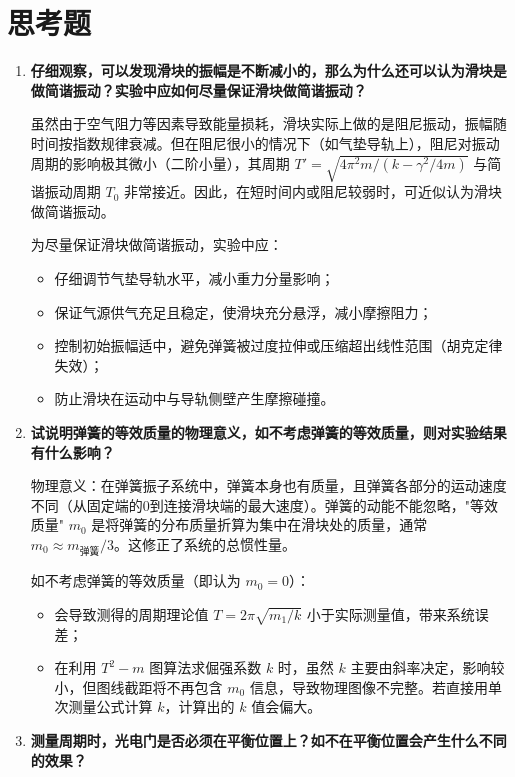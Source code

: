 \documentclass[11pt]{article}
\begin{document}
\section{思考题}

\begin{enumerate}
    \item \textbf{仔细观察，可以发现滑块的振幅是不断减小的，那么为什么还可以认为滑块是做简谐振动？实验中应如何尽量保证滑块做简谐振动？}
    
    虽然由于空气阻力等因素导致能量损耗，滑块实际上做的是阻尼振动，振幅随时间按指数规律衰减。但在阻尼很小的情况下（如气垫导轨上），阻尼对振动周期的影响极其微小（二阶小量），其周期 $T' = \sqrt{4\pi^2 m / (k - \gamma^2/4m)}$ 与简谐振动周期 $T_0$ 非常接近。因此，在短时间内或阻尼较弱时，可近似认为滑块做简谐振动。
    
    为尽量保证滑块做简谐振动，实验中应：
    \begin{itemize}
        \item 仔细调节气垫导轨水平，减小重力分量影响；
        \item 保证气源供气充足且稳定，使滑块充分悬浮，减小摩擦阻力；
        \item 控制初始振幅适中，避免弹簧被过度拉伸或压缩超出线性范围（胡克定律失效）；
        \item 防止滑块在运动中与导轨侧壁产生摩擦碰撞。
    \end{itemize}

    \item \textbf{试说明弹簧的等效质量的物理意义，如不考虑弹簧的等效质量，则对实验结果有什么影响？}
    
    物理意义：在弹簧振子系统中，弹簧本身也有质量，且弹簧各部分的运动速度不同（从固定端的0到连接滑块端的最大速度）。弹簧的动能不能忽略，"等效质量" $m_0$ 是将弹簧的分布质量折算为集中在滑块处的质量，通常 $m_0 \approx m_{\text{弹簧}}/3$。这修正了系统的总惯性量。
    
    如不考虑弹簧的等效质量（即认为 $m_0=0$）：
    \begin{itemize}
        \item 会导致测得的周期理论值 $T = 2\pi\sqrt{m_1/k}$ 小于实际测量值，带来系统误差；
        \item 在利用 $T^2-m$ 图算法求倔强系数 $k$ 时，虽然 $k$ 主要由斜率决定，影响较小，但图线截距将不再包含 $m_0$ 信息，导致物理图像不完整。若直接用单次测量公式计算 $k$，计算出的 $k$ 值会偏大。
    \end{itemize}

    \item \textbf{测量周期时，光电门是否必须在平衡位置上？如不在平衡位置会产生什么不同的效果？}
    

\end{enumerate}
\end{document}
